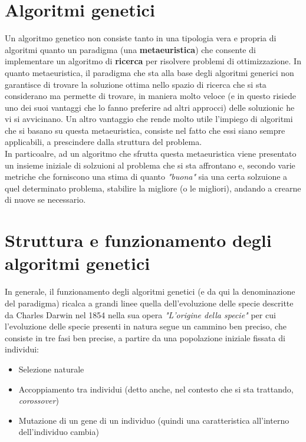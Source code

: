 \section{Algoritmi genetici}
    Un algoritmo genetico non consiste tanto in una tipologia vera e propria di algoritmi quanto un paradigma (una \textbf{metaeuristica}) che consente di implementare un algoritmo di \textbf{ricerca} per risolvere problemi di ottimizzazione. In quanto metaeuristica, il paradigma che sta alla base degli algoritmi generici non garantisce di trovare la soluzione ottima nello spazio di ricerca che si sta considerano ma permette di trovare, in maniera molto veloce (e in questo risiede uno dei suoi vantaggi che lo fanno preferire ad altri approcci) delle soluzionic he vi si avvicinano. Un altro vantaggio che rende molto utile l'impiego di algoritmi che si basano su questa metaeuristica, consiste nel fatto che essi siano sempre applicabili, a prescindere dalla struttura del problema. \\
    In particoalre, ad un algoritmo che sfrutta questa metaeuristica viene presentato un insieme iniziale di solzuioni al problema che si sta affrontano e, secondo varie metriche che forniscono una stima di quanto \textit{"buona"} sia una certa solzuione a quel determinato problema, stabilire la migliore (o le migliori), andando a crearne di nuove se necessario.

\section{Struttura e funzionamento degli algoritmi genetici}
    In generale, il funzionamento degli algoritmi genetici (e da qui la denominazione del paradigma) ricalca a grandi linee quella dell'evoluzione delle specie descritte da Charles Darwin nel 1854 nella sua opera \textit{"L'origine della specie"} per cui l'evoluzione delle specie presenti in natura segue un cammino ben preciso, che consiste in tre fasi ben precise, a partire da una popolazione iniziale fissata di individui:

    \begin{itemize}
        \item Selezione naturale
        \item Accoppiamento tra individui (detto anche, nel contesto che si sta trattando, \textit{corossover})
        \item Mutazione di un gene di un individuo (quindi una caratteristica all'interno dell'individuo cambia)
    \end{itemize}

